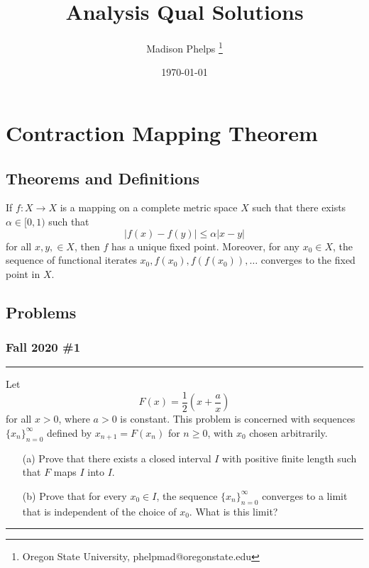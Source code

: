 \documentclass{article}
\title{Analysis Qual Solutions}
\author{Madison Phelps \thanks{Oregon State University, phelpmad@oregonstate.edu}}
\date{\today}
\begin{document}
\maketitle

\thispagestyle{empty}

\break

\tableofcontents

\thispagestyle{empty}

\break

\section{Contraction Mapping Theorem}

\subsection{Theorems and Definitions}

\begin{theorem}\label{thm:banach-fixed-point}
	If $f: X\to X$ is a mapping on a complete metric space $X$ such that there exists $\alpha \in [0,1)$ such that 
	\[|f(x) - f(y)|\leq \alpha |x-y|\]
	for all $x,y,\in X$, then $f$ has a unique fixed point. Moreover, for any $x_0\in X$, the sequence of functional iterates 
	$x_0, f(x_0), f(f(x_0)),\dots$ converges to the fixed point in $X$. 
\end{theorem}

\break

\subsection{Problems}

\subsubsection{Fall 2020 \#1}

\hrule 

Let 
	\[F(x) = \frac{1}{2}\left(x + \frac{a}{x}\right)\]
		for all $x>0$, where $a>0$ is constant. 
		This problem is concerned with sequences $\{x_n\}_{n=0}^\infty$ 
		defined by $x_{n+1} = F(x_n)$ for $n\geq 0$, with $x_0$ chosen arbitrarily.
	\begin{enumerate}
		\item[(a)] Prove that there exists a closed interval $I$ with positive finite length such that $F$ maps $I$ into $I$.
		
		\item[(b)] Prove that for every $x_0\in I$, the sequence $\{x_n\}_{n=0}^\infty$ converges to a limit 
			that is independent of the choice of $x_0$. What is this limit?
	\end{enumerate}
\hrule 
\end{document}
